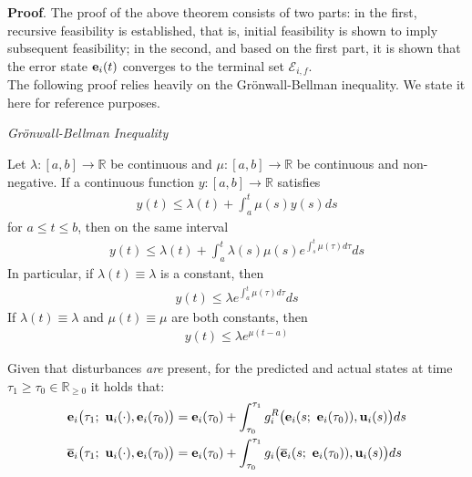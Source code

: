 \textbf{Proof}. The proof of the above theorem consists of two parts:
in the first, recursive feasibility is established, that is, initial
feasibility is shown to imply subsequent feasibility; in the second, and based
on the first part, it is shown that the error state $\bm{\mathbf{e}}_i(t)$ converges
to the terminal set $\mathcal{E}_{i,f}$.\\

The following proof relies heavily on the Gr\"{o}nwall-Bellman inequality.
We state it here for reference purposes.
\begin{bw_box}
  \begin{lemma} \cite{khalil_nonlinear_systems} \textit{Gr\"{o}nwall-Bellman Inequality}

    Let $\lambda : [a,b] \to \mathbb{R}$ be continuous and
    $\mu : [a,b] \to \mathbb{R}$ be continuous and non-negative. If a
    continuous function $y : [a,b] \to \mathbb{R}$ satisfies
    \begin{align}
      y(t) \leq \lambda(t) + \int_a^t \mu(s) y(s) ds
    \end{align}
    for $a \leq t \leq b$, then on the same interval
    \begin{align}
      y(t) \leq \lambda(t) + \int_a^t \lambda(s) \mu(s) e^{\int_s^t \mu(\tau)d\tau} ds
    \end{align}
    In particular, if $\lambda(t) \equiv \lambda$ is a constant, then
    \begin{align}
      y(t) \leq \lambda e^{\int_a^t \mu(\tau)d\tau} ds
    \end{align}
    If $\lambda(t) \equiv \lambda$ and $\mu(t) \equiv \mu$ are both constants,
    then
    \begin{align}
      y(t) \leq \lambda e^{\mu (t - a)}
    \end{align}
    \label{lemma:bellman_inequality}
  \end{lemma}
\end{bw_box}

\begin{bw_box}
  \begin{remark}
    Given that disturbances \textit{are} present, for the predicted and actual
    states at time $\tau_1 \geq \tau_0 \in \mathbb{R}_{\geq 0}$ it holds that:
    \begin{align}
      \bm{\mathbf{e}}_i\big(\tau_1;\ \bm{\mathbf{u}}_i(\cdot), \bm{\mathbf{e}}_i(\tau_0)\big) &=
        \bm{\mathbf{e}}_i(\tau_0) + \int_{\tau_0}^{\tau_1} g_i^R\big(\bm{\mathbf{e}}_i(s;\ \bm{\mathbf{e}}_i(\tau_0)), \bm{\mathbf{u}}_i(s)\big) ds \\
      \overline{\bm{\mathbf{e}}}_i\big(\tau_1;\ \bm{\mathbf{u}}_i(\cdot), \bm{\mathbf{e}}_i(\tau_0)\big) &=
        \bm{\mathbf{e}}_i(\tau_0) + \int_{\tau_0}^{\tau_1} g_i\big(\overline{\bm{\mathbf{e}}}_i(s;\ \bm{\mathbf{e}}_i(\tau_0)), \bm{\mathbf{u}}_i(s)\big) ds
    \end{align}
    \label{remark:predicted_actual_equations_with_disturbance}
  \end{remark}
\end{bw_box}


